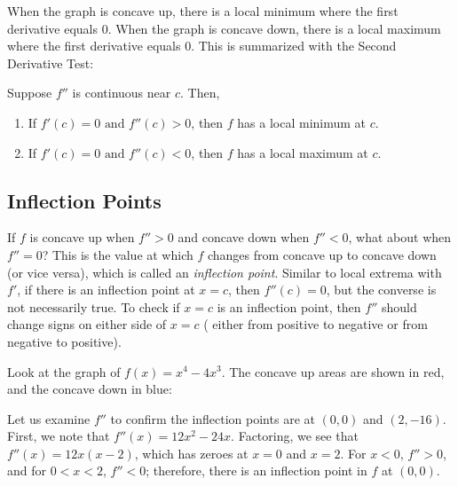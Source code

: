 When the graph is concave up, there is a local minimum where the first 
derivative equals $0$. When the graph is concave down, there is a local 
maximum where the first derivative equals $0$. This is summarized with the 
Second Derivative Test:

Suppose $f''$ is continuous near $c$. Then,
\begin{enumerate}
\item If $f'(c) = 0 \text{ and } f''(c)>0$, then $f$ has a local minimum at $c$.
\item If $f'(c) =0 \text{ and } f''(c)<0$, then $f$ has a local maximum at $c$. 
\end{enumerate}


\subsection{Inflection Points}
If $f$ is concave up when $f''>0$ and concave down when $f''<0$, what about 
when $f''=0$? This is the value at which $f$ changes from concave up to concave 
down (or vice versa), which is called an \textit{inflection point}. Similar to 
local extrema with $f'$, if there is an inflection point at $x=c$, then $f''(c)
=0$, but the converse is not necessarily true. To check if $x=c$ is an 
inflection point, then $f''$ should change signs on either side of $x=c$ (
either from positive to negative or from negative to positive). 

Look at the graph of $f(x) = x^4-4x^3$. The concave up areas are shown in red, 
and the concave down in blue:

\begin{figure}[H]
\centering
{}
\end{figure}
Let us examine $f''$ to confirm the inflection points are at $(0, 0)$ and $(2, 
-16)$. First, we note that $f''(x) = 12x^2-24x$. Factoring, we see that $f''(x) 
= 12x(x-2)$, which has zeroes at $x=0$ and $x=2$. For $x<0$, $f''>0$, and for 
$0<x<2$, $f''<0$; therefore, there is an inflection point in $f$ at $(0, 0)$. 

